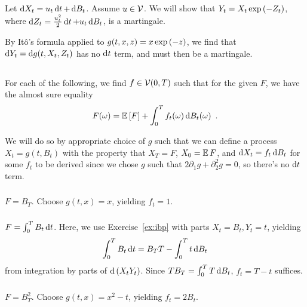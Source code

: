 \documentclass{article}
\begin{document}
        \subsection{} %
        Let \(\mathop{\mathrm{d} X_t }=u_t\mathop{\mathrm{d} t }+\mathop{\mathrm{d} B_t }\). Assume \(u\in\mathcal{V}\). We will show that \(Y_t=X_t\exp \left({-Z_t}\right)\), where \(\mathop{\mathrm{d} Z_t }=\frac{u_t^2}{2}\mathop{\mathrm{d} t }+u_t\mathop{\mathrm{d} B_t }\), is a martingale.

        By It\^{o}'s formula applied to \(g(t, x, z)=x\exp\left({-z}\right)\), we find that \(\mathop{\mathrm{d} Y_t }=\mathop{\mathrm{d} g(t, X_t, Z_t) }\) has no \(\mathop{\mathrm{d} t }\) term, and must then be a martingale.
        \subsection{} %
        For each of the following, we find \(f\in\mathcal{V}(0, T)\) such that for the given \(F\), we have the almost sure equality
        \[
          F(\omega)=\operatorname{\mathbb{E}}\left[{ F}\right] + \int_0^T f_t(\omega)\mathop{\mathrm{d} B_t(\omega) }\,\,.
        \]

        We will do so by appropriate choice of \(g\) such that we can define a process \(X_t=g(t, B_t)\) with the property that \(X_T=F\), \(X_0=\operatorname{\mathbb{E}} F\), and \(\mathop{\mathrm{d} X_t }=f_t\mathop{\mathrm{d} B_t }\) for some \(f_t\) to be derived since we chose \(g\) such that \(2\partial_1g+\partial_2^2g=0\), so there's no \(\mathop{\mathrm{d} t }\) term.

        \subsubsection{}

        \(F=B_T\). Choose \(g(t, x)=x\), yielding \(f_t=1\).
        \subsubsection{}

        \(F=\int_0^TB_t\mathop{\mathrm{d} t }\). Here, we use Exercise~\ref{ex:ibp} with parts \(X_t=B_t,Y_t=t\), yielding
        \[
          \int_0^TB_t\mathop{\mathrm{d} t }=B_TT-\int_0^Tt\mathop{\mathrm{d} B_t }
        \]
        from integration by parts of \(\mathop{\mathrm{d} \left({X_tY_t}\right) }\). Since \(TB_T=\int_0^T T\mathop{\mathrm{d} B_t }\), \(f_t=T-t\) suffices.
        \subsubsection{}

        \(F=B_T^2\). Choose \(g(t, x)=x^2-t\), yielding \(f_t=2B_t\).
        \subsubsection{}
\end{document}
